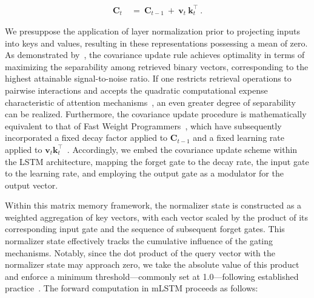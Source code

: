 \begin{align}
\mathbf{C}_t \ &= \ \mathbf{C}_{t-1} \ + \ \mathbf{v}_{t} \ \mathbf{k}_t^\top \ .
\end{align}

We presuppose the application of layer normalization prior to projecting inputs into keys and values, resulting in these representations possessing a mean of zero. As demonstrated by~\citet{Dayan:91}, the covariance update rule achieves optimality in terms of maximizing the separability among retrieved binary vectors, corresponding to the highest attainable signal-to-noise ratio. If one restricts retrieval operations to pairwise interactions and accepts the quadratic computational expense characteristic of attention mechanisms~\citep{Krotov:16,Krotov:17,Ramsauer:21}, an even greater degree of separability can be realized. Furthermore, the covariance update procedure is mathematically equivalent to that of Fast Weight Programmers~\citep{Schmidhuber:92ncfastweights,Schlag:21}, which have subsequently incorporated a fixed decay factor applied to $\mathbf{C}_{t-1}$ and a fixed learning rate applied to 
$\mathbf{v}_{t} \mathbf{k}_t ^\top$~\citep{Ba:16}.
Accordingly, we embed the covariance update scheme within the LSTM architecture, mapping the forget gate to the decay rate, the input gate to the learning rate, and employing the output gate as a modulator for the output vector.

Within this matrix memory framework, the normalizer state is constructed as a weighted aggregation of key vectors, with each vector scaled by the product of its corresponding input gate and the sequence of subsequent forget gates. This normalizer state effectively tracks the cumulative influence of the gating mechanisms. Notably, since the dot product of the query vector with the normalizer state may approach zero, we take the absolute value of this product and enforce a minimum threshold—commonly set at 1.0—following established practice~\citep{Sun:23arxiv}. The forward computation in mLSTM proceeds as follows:

